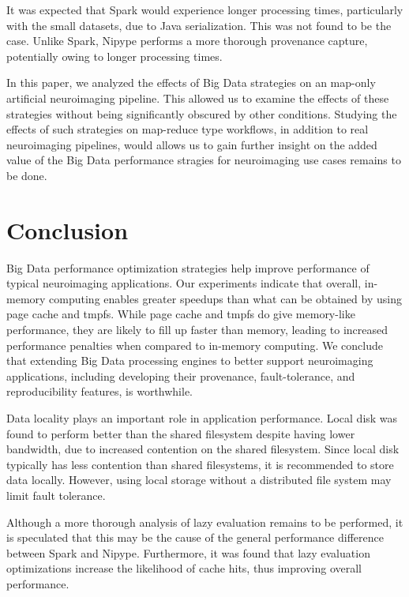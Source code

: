 \documentclass{IEEEtran}
\begin{document}
It was expected that Spark would experience longer processing times, particularly
with the small datasets, due to Java serialization. This was not found to be the case. 
Unlike Spark, Nipype performs a more thorough provenance capture, potentially owing to longer
processing times.

In this paper, we analyzed the effects of Big Data strategies on an map-only artificial
neuroimaging pipeline. This allowed us to examine the effects of these strategies
without being significantly obscured by other conditions. Studying the effects 
of such strategies on map-reduce type
workflows, in addition to real neuroimaging pipelines, would allows us to gain
further insight on the added
value of the Big Data performance stragies for neuroimaging use cases remains to be
done.

\section{Conclusion} %
\label{sec:conclusion}

Big Data performance optimization strategies help improve performance of typical 
neuroimaging applications. Our experiments indicate that overall, in-memory computing 
enables greater speedups than what can be obtained by using page cache 
and tmpfs. While page cache and tmpfs do give memory-like performance, 
they are likely to fill up faster than memory, leading to increased 
performance penalties when compared to in-memory computing. We conclude 
that extending Big Data processing engines to better support 
neuroimaging applications, including developing their provenance, 
fault-tolerance, and reproducibility features, is worthwhile.

Data locality plays an important role in application 
performance. Local disk was found to perform better than the shared 
filesystem despite having lower bandwidth, due to increased contention on 
the shared filesystem. Since local disk typically has less 
contention than shared filesystems, it is recommended to store data locally.
However, using local storage without a distributed file system 
may limit fault tolerance.

Although a more thorough analysis of lazy evaluation remains to be 
performed, it is speculated that this may be the cause of the general 
performance difference between Spark and Nipype. Furthermore, it was
found that lazy evaluation optimizations increase the likelihood of 
cache hits, thus improving overall performance.
\end{document}
